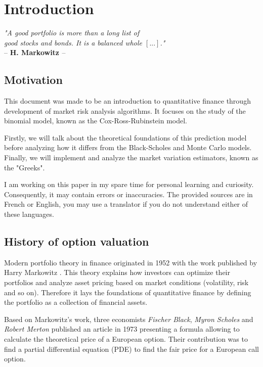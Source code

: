 \section{Introduction}
\vspace{0.5cm}
\begin{center}
    \textit{"A good portfolio is more than a long list of \\
    good stocks and bonds. It is a balanced whole $[...]$."}\\
    -- \textbf{H. Markowitz \cite{MarkowitzQuote}} --
\end{center}
\vspace{0.5cm}
    
\subsection{Motivation}
This document was made to be an introduction to quantitative finance through development of market risk analysis algorithms.
It focuses on the study of the binomial model, known as the Cox-Ross-Rubinstein model.

Firstly, we will talk about the theoretical foundations of this prediction model before analyzing how it differs from the Black-Scholes and Monte Carlo models.
Finally, we will implement and analyze the  market variation estimators, known as the "Greeks".

I am working on this paper in my spare time for personal learning and curiosity. Consequently, it may contain errors or inaccuracies. 
The provided sources are in French or English, you may use a translator if you do not understand either of these languages.

\subsection{History of option valuation}

Modern portfolio theory in finance originated in 1952 with the work published by Harry Markowitz \cite{HarryMarkowitz}.
This theory explains how investors can optimize their portfolios and analyze asset pricing based on market conditions (volatility, risk and so on). 
Therefore it lays the foundations of quantitative finance by defining the portfolio as a collection of financial assets.

Based on Markowitz's work, three economists \textit{Fischer Black}, \textit{Myron Scholes} and \textit{Robert Merton} published an article in 1973 presenting a formula allowing to calculate the theoretical price of a European option.
Their contribution was to find a partial differential equation (PDE) to find the fair price for a European call option. \cite{Option}

